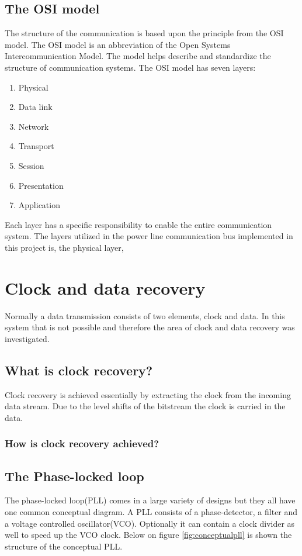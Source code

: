 \subsection{The OSI model}
The structure of the communication is based upon the principle from the OSI model. The OSI model is an abbreviation of the Open Systems Intercommunication Model. The model helps describe and standardize the structure of communication systems. The OSI model has seven layers:
\begin{enumerate}
	\item Physical
	\item Data link
	\item Network
	\item Transport
	\item Session
	\item Presentation
	\item Application
\end{enumerate}

Each layer has a specific responsibility to enable the entire communication system. The layers utilized in the power line communication bus implemented in this project is, the physical layer, 


\section{Clock and data recovery}
Normally a data transmission consists of two elements, clock and data. In this system that is not possible and therefore the area of clock and data recovery was investigated.

\subsection{What is clock recovery?}
Clock recovery is achieved essentially by extracting the clock from the incoming data stream. Due to the level shifts of the bitstream the clock is carried in the data.

\subsubsection{How is clock recovery achieved?}


\subsection{The Phase-locked loop}
The phase-locked loop(PLL) comes in a large variety of designs but they all have one common conceptual diagram. A PLL consists of a phase-detector, a filter and a voltage controlled oscillator(VCO). Optionally it can contain a clock divider as well to speed up the VCO clock. Below on figure \ref{fig:conceptualpll} is shown the structure of the conceptual PLL.

